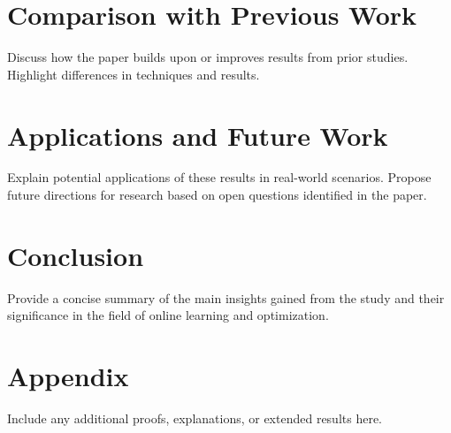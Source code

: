 \documentclass[11pt,a4paper]{article}
\begin{document}
\section{Comparison with Previous Work}
Discuss how the paper builds upon or improves results from prior studies. Highlight differences in techniques and results.

\section{Applications and Future Work}
Explain potential applications of these results in real-world scenarios. Propose future directions for research based on open questions identified in the paper.

\section{Conclusion}
Provide a concise summary of the main insights gained from the study and their significance in the field of online learning and optimization.

\appendix
\section{Appendix}
Include any additional proofs, explanations, or extended results here.



\end{document}
